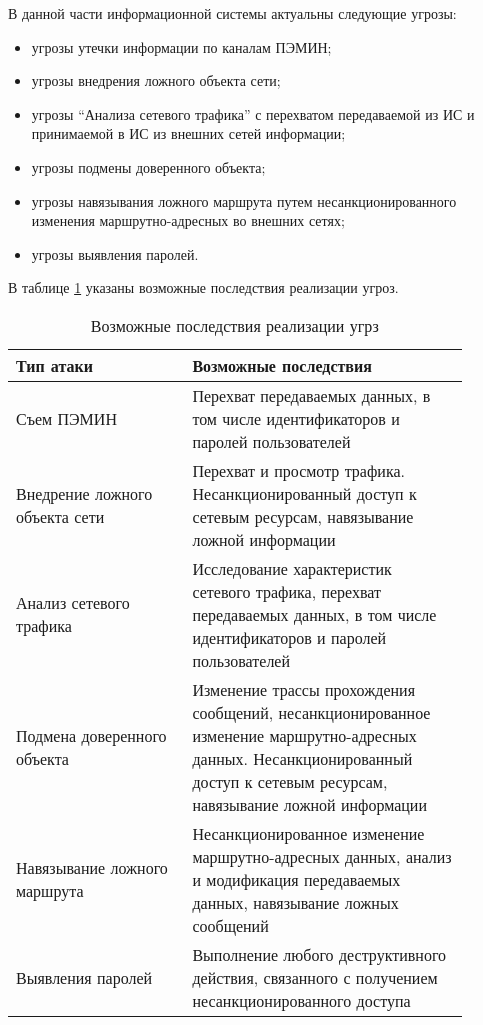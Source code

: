 В данной части информационной системы актуальны следующие угрозы:

\begin{itemize}
 \item угрозы утечки информации по каналам ПЭМИН;
 \item угрозы внедрения ложного объекта сети;
 \item угрозы ``Анализа сетевого трафика'' с перехватом передаваемой из ИС и принимаемой в ИС из внешних сетей информации;
 \item угрозы подмены доверенного объекта;
 \item угрозы навязывания ложного маршрута путем несанкционированного изменения маршрутно-адресных во внешних сетях;
 \item угрозы выявления паролей.
\end{itemize}

В таблице \ref{tab:threats} указаны возможные последствия реализации угроз.

\begin{table}[!ht]
 \caption{Возможные последствия реализации угрз} 
 \label{tab:threats}
  \begin{tabular}{|p{0.35\linewidth}|p{0.55\linewidth}|}
   \hline
   Тип атаки & Возможные последствия \\ 
   \hline
   Съем ПЭМИН & Перехват   передаваемых   данных,  в том числе идентификаторов и паролей пользователей \\
   \hline
   Внедрение ложного объекта сети & Перехват и просмотр трафика. Несанкционированный доступ  к  сетевым  ресурсам, навязывание ложной информации \\
   \hline
   Анализ сетевого трафика & Исследование   характеристик   сетевого   трафика, перехват   передаваемых   данных,  в том числе идентификаторов и паролей пользователей\\
   \hline
   Подмена доверенного объекта & Изменение    трассы    прохождения    сообщений, несанкционированное    изменение   маршрутно-адресных  данных.  Несанкционированный  доступ  к сетевым ресурсам, навязывание ложной информации\\
   \hline
   Навязывание ложного маршрута & Несанкционированное    изменение    маршрутно-адресных    данных,    анализ    и    модификация передаваемых    данных,   навязывание    ложных сообщений\\
   \hline
   Выявления паролей & Выполнение   любого   деструктивного   действия, связанного  с  получением  несанкционированного доступа\\
   \hline
  \end{tabular}
\end{table}